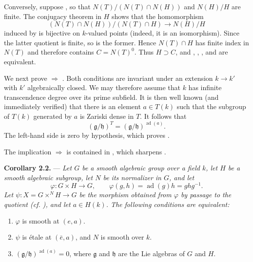Conversely, suppose , so that
\(N(T)/(N(T)\cap N(H))\) and \(N(H)/H\) are finite. The conjugacy
theorem in \(H\) shows that the homomorphism
\[
  (N(T)\cap N(H))/(N(T)\cap H)\longrightarrow N(H)/H
\]
induced by  is bijective on \(k\)-valued points
(indeed, it is an isomorphism). Since the latter quotient is finite,
so is the former. Hence \(N(T)\cap H\) has finite index in \(N(T)\)
and therefore contains \(C=N(T)^0\). Thus \(H\supset C\), and ,
, , and  are equivalent.

We next prove  \(\Rightarrow\) . Both conditions are
invariant under an extension \(k\to k'\) with \(k'\) algebraically
closed. We may therefore assume that \(k\) has infinite
transcendence degree over its prime subfield. It is then well known
(and immediately verified) that there is an element \(a\in T(k)\) such
that the subgroup of \(T(k)\) generated by \(a\) is Zariski dense in
\(T\). It follows that
\[
  (\mathfrak g/\mathfrak h)^T
  =(\mathfrak g/\mathfrak h)^{\operatorname{ad}(a)}.
\]
The left-hand side is zero by hypothesis, which proves .

The implication  \(\Rightarrow\)  is contained in , which sharpens .

\medskip
\noindent{}\textbf{Corollary 2.2.} ---
\textit{Let \(G\) be a smooth algebraic group over a field \(k\), let
\(H\) be a smooth algebraic subgroup, let \(N\) be its normalizer in
\(G\), and let}
\[
  \varphi:G\times H\longrightarrow G,\qquad
  \varphi(g,h)=\operatorname{ad}(g)h=ghg^{-1}.
\]
\textit{Let \(\psi:X=G\times^N H\to G\) be the morphism obtained from
\(\varphi\) by passage to the quotient (cf. ), and let
\(a\in H(k)\). The following conditions are equivalent:}

\begin{enumerate}
\item[(i)] 
  \(\varphi\) is smooth at \((e,a)\).
\item[(ii)] 
  \(\psi\) is étale at \((\bar e,a)\), and \(N\) is smooth over \(k\).
\item[(iii)] 
  \((\mathfrak g/\mathfrak h)^{\operatorname{ad}(a)}=0\), where
  \(\mathfrak g\) and \(\mathfrak h\) are the Lie algebras of \(G\)
  and \(H\).
\end{enumerate}

